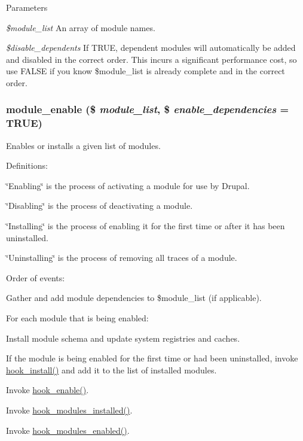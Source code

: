 \begin{DoxyParams}{Parameters}
\item[{\em \$module\_\-list}]An array of module names. \item[{\em \$disable\_\-dependents}]If TRUE, dependent modules will automatically be added and disabled in the correct order. This incurs a significant performance cost, so use FALSE if you know \$module\_\-list is already complete and in the correct order. \end{DoxyParams}
\hypertarget{module_8inc_a4b2c9ea60d7c88595eaebfc4abd5f1bf}{
\subsubsection[{module\_\-enable}]{\setlength{\rightskip}{0pt plus 5cm}module\_\-enable (\$ {\em module\_\-list}, \/  \$ {\em enable\_\-dependencies} = {\ttfamily TRUE})}}
\label{module_8inc_a4b2c9ea60d7c88595eaebfc4abd5f1bf}
Enables or installs a given list of modules.

Definitions:
\begin{DoxyItemize}
\item \char`\"{}Enabling\char`\"{} is the process of activating a module for use by Drupal.
\item \char`\"{}Disabling\char`\"{} is the process of deactivating a module.
\item \char`\"{}Installing\char`\"{} is the process of enabling it for the first time or after it has been uninstalled.
\item \char`\"{}Uninstalling\char`\"{} is the process of removing all traces of a module.
\end{DoxyItemize}

Order of events:
\begin{DoxyItemize}
\item Gather and add module dependencies to \$module\_\-list (if applicable).
\item For each module that is being enabled:
\begin{DoxyItemize}
\item Install module schema and update system registries and caches.
\item If the module is being enabled for the first time or had been uninstalled, invoke \hyperlink{group__hooks_ga1ecdb5a2a046ea63dc790c3ed90338e5}{hook\_\-install()} and add it to the list of installed modules.
\item Invoke \hyperlink{group__hooks_gaedcfb58c08d5c5f8ffcd1059ceeb39e4}{hook\_\-enable()}.
\end{DoxyItemize}
\item Invoke \hyperlink{group__hooks_ga71b7268520567cac1a2f296c205e5227}{hook\_\-modules\_\-installed()}.
\item Invoke \hyperlink{group__hooks_ga0eb7c67333e0f40b4a46c0dc4c4a92f3}{hook\_\-modules\_\-enabled()}.
\end{DoxyItemize}


